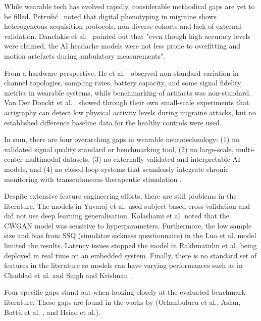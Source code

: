 \documentclass[12pt, a4paper]{report}
\begin{document}
While wearable tech has evolved rapidly, considerable methodical gaps are yet to be filled. Petru\v{s}i\'{c}~\cite{Petrusic2025} noted that digital phenotyping in migraine shows heterogeneous acquisition protocols, non-diverse cohorts and lack of external validation. Danelakis et al.~\cite{DanelakisStubberud2025} pointed out that "even though high accuracy levels were claimed, the AI headache models were not less prone to overfitting and motion artefacts during ambulatory measurements".

From a hardware perspective, He et al.~\cite{He2023} observed non-standard variation in channel topologies, sampling rates, battery capacity, and some signal fidelity metrics in wearable systems, while benchmarking of artifacts was non-standard. Van Der Donckt et al.~\cite{VanDerDonckt2025} showed through their own small-scale experiments that actigraphy can detect low physical activity levels during migraine attacks, but no established difference baseline data for the healthy controls were used.

In sum, there are four overarching gaps in wearable neurotechnology: (1) no validated signal quality standard or benchmarking tool, (2) no large-scale, multi-center multimodal datasets, (3) no externally validated and interpretable AI models, and (4) no closed-loop systems that seamlessly integrate chronic monitoring with transcutaneous therapeutic stimulation \cite{Petrusic2025,He2023,DanelakisStubberud2025}.


Despite extensive feature engineering efforts, there are still problems in the literature. The models in Yuvaraj et al. \cite{Yuvaraj2023} used subject-based cross-validation and did not use deep learning generalisation. Kalashami et al. \cite{Kalashami2022} noted that the CWGAN model was sensitive to hyperparameters. Furthermore, the low sample size and bias from SSQ (simulator sickness questionnaire) in the Luo et al. \cite{Luo2024} model limited the results. Latency issues stopped the model in Rakhmatulin et al. \cite{Rakhmatulin2024} being deployed in real time on an embedded system. Finally, there is no standard set of features in the literature so models can have varying performances such as in Chaddad et al. \cite{Chaddad2023} and Singh and Krishnan \cite{Singh2023}.



Four specific gaps stand out when looking closely at the evaluated benchmark literature. These gaps are found in the works by (Orhanbulucu et al.\cite{orhanbulucu2023hybrid}, Aslan, Batt\`u et al. \cite{battu2025longterm}, and Hsiao et al.\cite{hsiao2024brainstem}).
\end{document}
